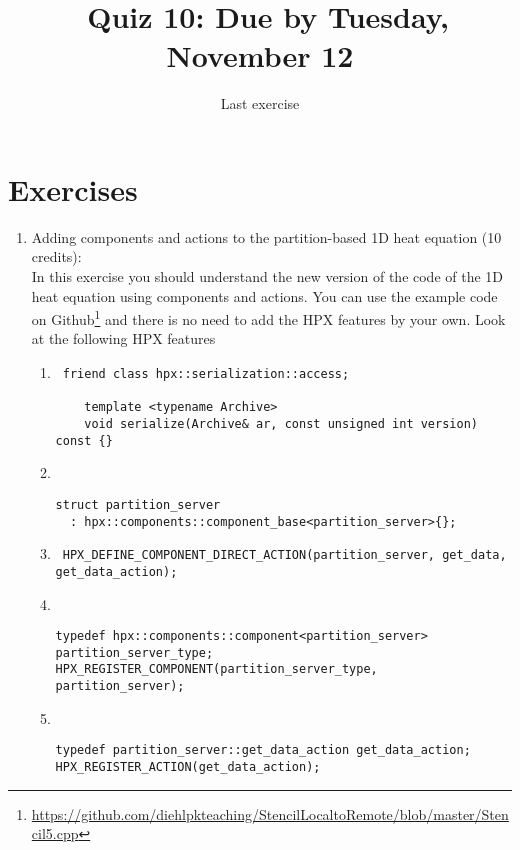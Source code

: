 \documentclass[11pt]{article}
\begin{document}
\title{\coursename~Quiz 10: Due by Tuesday, November 12}
\date{Last exercise}
\maketitle

\medskip


\section*{Exercises}

\begin{enumerate}
\item Adding components and actions to the partition-based 1D heat equation (10 credits): \\
In this exercise you should understand the new version of the code of the 1D heat equation using components and actions. You can use the example code on Github\footnote{\url{https://github.com/diehlpkteaching/StencilLocaltoRemote/blob/master/Stencil5.cpp}} and there is no need to add the HPX features by your own. Look at the following HPX features
\begin{enumerate}
\item \begin{lstlisting}
 friend class hpx::serialization::access;

    template <typename Archive>
    void serialize(Archive& ar, const unsigned int version) const {}
\end{lstlisting} 
\item \textcolor{white}{test}

\begin{lstlisting}
struct partition_server
  : hpx::components::component_base<partition_server>{};
\end{lstlisting}

\item \lstinline| HPX_DEFINE_COMPONENT_DIRECT_ACTION(partition_server, get_data, get_data_action);|

\item \textcolor{white}{test}
\begin{lstlisting}
typedef hpx::components::component<partition_server> partition_server_type;
HPX_REGISTER_COMPONENT(partition_server_type, partition_server);
\end{lstlisting}

\item \textcolor{white}{test} 
\begin{lstlisting}
typedef partition_server::get_data_action get_data_action;
HPX_REGISTER_ACTION(get_data_action);
\end{lstlisting}


\end{enumerate}
\end{enumerate}
\end{document}
